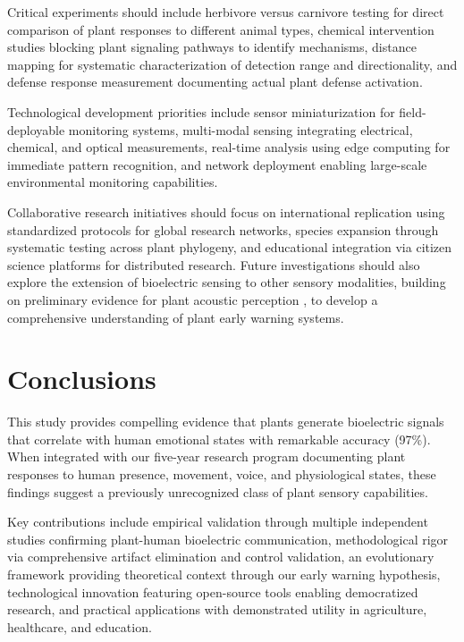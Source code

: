 \documentclass{article}
\begin{document}
Critical experiments should include herbivore versus carnivore testing for direct comparison of plant responses to different animal types, chemical intervention studies blocking plant signaling pathways to identify mechanisms, distance mapping for systematic characterization of detection range and directionality, and defense response measurement documenting actual plant defense activation.

Technological development priorities include sensor miniaturization for field-deployable monitoring systems, multi-modal sensing integrating electrical, chemical, and optical measurements, real-time analysis using edge computing for immediate pattern recognition, and network deployment enabling large-scale environmental monitoring capabilities.

Collaborative research initiatives should focus on international replication using standardized protocols for global research networks, species expansion through systematic testing across plant phylogeny, and educational integration via citizen science platforms for distributed research. Future investigations should also explore the extension of bioelectric sensing to other sensory modalities, building on preliminary evidence for plant acoustic perception \cite{peter2021plants}, to develop a comprehensive understanding of plant early warning systems.

\section{Conclusions}

This study provides compelling evidence that plants generate bioelectric signals that correlate with human emotional states with remarkable accuracy (97\%). When integrated with our five-year research program documenting plant responses to human presence, movement, voice, and physiological states, these findings suggest a previously unrecognized class of plant sensory capabilities.

Key contributions include empirical validation through multiple independent studies confirming plant-human bioelectric communication, methodological rigor via comprehensive artifact elimination and control validation, an evolutionary framework providing theoretical context through our early warning hypothesis, technological innovation featuring open-source tools enabling democratized research, and practical applications with demonstrated utility in agriculture, healthcare, and education.
\end{document}
